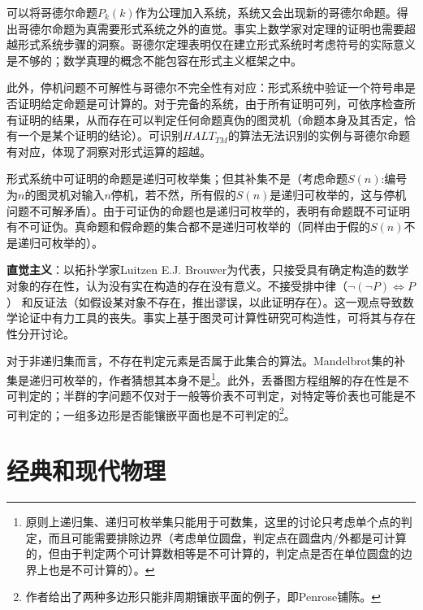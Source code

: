 \par 可以将哥德尔命题$P_k(k)$作为公理加入系统，系统又会出现新的哥德尔命题。得出哥德尔命题为真需要形式系统之外的直觉。事实上数学家对定理的证明也需要超越形式系统步骤的洞察。哥德尔定理表明仅在建立形式系统时考虑符号的实际意义是不够的；数学真理的概念不能包容在形式主义框架之中。

\par 此外，停机问题不可解性与哥德尔不完全性有对应：形式系统中验证一个符号串是否证明给定命题是可计算的。对于完备的系统，由于所有证明可列，可依序检查所有证明的结果，从而存在可以判定任何命题真伪的图灵机（命题本身及其否定，恰有一个是某个证明的结论）。可识别$HALT_{TM}$的算法无法识别的实例与哥德尔命题有对应，体现了洞察对形式运算的超越。

\par 形式系统中可证明的命题是递归可枚举集；但其补集不是（考虑命题$S(n)$:编号为$n$的图灵机对输入$n$停机，若不然，所有假的$S(n)$是递归可枚举的，这与停机问题不可解矛盾）。由于可证伪的命题也是递归可枚举的，表明有命题既不可证明有不可证伪。真命题和假命题的集合都不是递归可枚举的（同样由于假的$S(n)$不是递归可枚举的）。

\par \textbf{直觉主义}：以拓扑学家Luitzen E.J. Brouwer为代表，只接受具有确定构造的数学对象的存在性，认为没有实在构造的存在没有意义。不接受排中律（$\lnot (\lnot P) \iff P$） 和反证法（如假设某对象不存在，推出谬误，以此证明存在）。这一观点导致数学论证中有力工具的丧失。事实上基于图灵可计算性研究可构造性，可将其与存在性分开讨论。

\par 对于非递归集而言，不存在判定元素是否属于此集合的算法。Mandelbrot集的补集是递归可枚举的，作者猜想其本身不是\footnote{原则上递归集、递归可枚举集只能用于可数集，这里的讨论只考虑单个点的判定，而且可能需要排除边界（考虑单位圆盘，判定点在圆盘内/外都是可计算的，但由于判定两个可计算数相等是不可计算的，判定点是否在单位圆盘的边界上也是不可计算的）。}。此外，丢番图方程组解的存在性是不可判定的；半群的字问题不仅对于一般等价表不可判定，对特定等价表也可能是不可判定的；一组多边形是否能镶嵌平面也是不可判定的\footnote{作者给出了两种多边形只能非周期镶嵌平面的例子，即Penrose铺陈。}。

\section{经典和现代物理}
